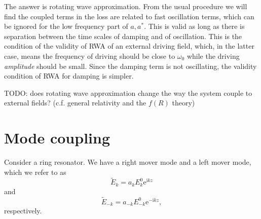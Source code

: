 \documentclass[hyperref, a4paper]{article}
\newcommand*{\ii}{\mathrm{i}}
\newcommand*{\ee}{\mathrm{e}}
\begin{document}
The answer is rotating wave approximation. 
From the usual procedure we will find the coupled terms in the loss are related to fast oscillation terms, 
which can be ignored for the low frequency part of $a, a^*$. 
This is valid as long as there is separation between the time scales of damping and of oscillation.
This is the condition of the validity of RWA of an external driving field, 
which, in the latter case, means the frequency of driving should be close to $\omega_0$
while the driving \emph{amplitude} should be small.
Since the damping term is not oscillating, 
the validity condition of RWA for damping is simpler.

TODO: does rotating wave approximation change the way the system couple to external fields?
(c.f. general relativity and the $f(R)$ theory)

\section{Mode coupling}

Consider a ring resonator. 
We have a right mover mode and a left mover mode, 
which we refer to as 
\begin{equation}
    \tilde{E}_k = a_k E_k^0 \ee^{\ii k z}
\end{equation}
and 
\begin{equation}
    \tilde{E}_{-k} = a_{-k} E_{-k}^0 \ee^{- \ii k z},
\end{equation}
respectively. 
\end{document}
